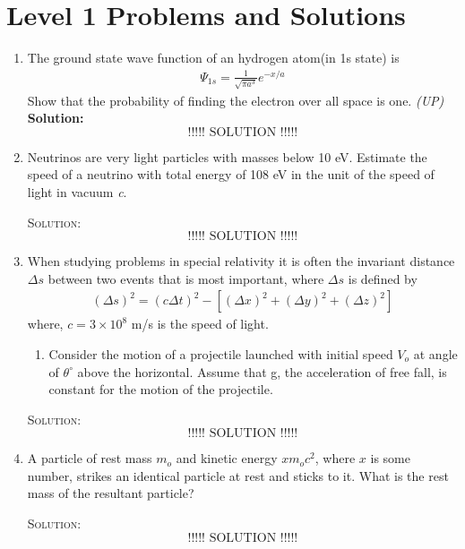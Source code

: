 \section{Level 1 Problems and Solutions}
\begin{enumerate}
\item The ground state wave function of an hydrogen atom(in 1s state) is
\begin{align}
\Psi_{1s} = \frac{1}{\sqrt{\pi a^3}}e^{-x/a}   \label{eq4}
\end{align}
Show that the probability of finding the electron over all space is one. \hfill \textsl{(UP)}
\textbf{Solution:}\\
\[
\text{!!!!! SOLUTION !!!!!}
\]
\item Neutrinos are very light particles with masses below 10 eV. Estimate the speed of a neutrino with total energy of 108 eV in the unit of the speed of light in vacuum \emph{c}.

\textsc{Solution:}\\
\[
\text{!!!!! SOLUTION !!!!!}
\]

\item When studying problems in special relativity it is often the invariant distance $\Delta s$ between two events that is most important, where $\Delta s$ is defined by
\begin{align}
(\Delta s)^2 = (c \Delta t)^2 - [(\Delta x)^2 + (\Delta y)^2 + (\Delta z)^2]   \label{eq5}
\end{align}
where, $c = 3\times10^8$ m/s is the speed of light.
\begin{enumerate}
    \item Consider the motion of a projectile launched with initial speed $V_{o}$ at angle of $\theta^\circ$ above the horizontal. Assume that g, the acceleration of free fall, is constant for the motion of the projectile.
\end{enumerate}

\textsc{Solution:}\\
\[
\text{!!!!! SOLUTION !!!!!}
\]

\item A particle of rest mass $m_o$ and kinetic energy $x{m_o}c^2$, where $x$ is some number, strikes an identical particle at rest and sticks to it. What is the rest mass of the resultant particle?

\textsc{Solution:}\\
\[
\text{!!!!! SOLUTION !!!!!}
\]

\end{enumerate}

